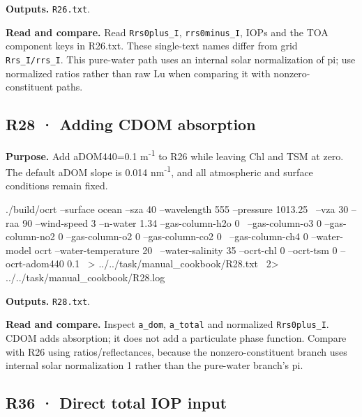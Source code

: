 \textbf{Outputs. }\texttt{R26.txt}.

\textbf{Read and compare. }Read \texttt{Rrs0plus\_\allowbreak{}I}, \texttt{rrs0minus\_\allowbreak{}I}, IOPs and the TOA component keys in R26.txt. These single-text names differ from grid \texttt{Rrs\_\allowbreak{}I/\allowbreak{}rrs\_\allowbreak{}I}. This pure-water path uses an internal solar normalization of pi; use normalized ratios rather than raw Lu when comparing it with nonzero-constituent paths.

\clearpage

\subsection{R28 · Adding CDOM absorption}
\label{sec:auto:09_cookbook:5.2}

\label{recipe:R28}

\textbf{Purpose. }Add aDOM440=0.1 m\textsuperscript{-1} to R26 while leaving Chl and TSM at zero. The default aDOM slope is 0.014 nm\textsuperscript{-1}, and all atmospheric and surface conditions remain fixed.

\noindent\begin{minipage}{\linewidth}
\begin{ManualCode}

./build/ocrt --surface ocean --sza 40 --wavelength 555 --pressure 1013.25 \
  --vza 30 --raa 90 --wind-speed 3 --n-water 1.34 --gas-column-h2o 0 \
  --gas-column-o3 0 --gas-column-no2 0 --gas-column-o2 0 --gas-column-co2 0 \
  --gas-column-ch4 0 --water-model ocrt --water-temperature 20 \
  --water-salinity 35 --ocrt-chl 0 --ocrt-tsm 0 --ocrt-adom440 0.1 \
  > ../../task/manual_cookbook/R28.txt \
  2> ../../task/manual_cookbook/R28.log

\end{ManualCode}
\end{minipage}\par

\textbf{Outputs. }\texttt{R28.txt}.

\textbf{Read and compare. }Inspect \texttt{a\_\allowbreak{}dom}, \texttt{a\_\allowbreak{}total} and normalized \texttt{Rrs0plus\_\allowbreak{}I}. CDOM adds absorption; it does not add a particulate phase function. Compare with R26 using ratios/reflectances, because the nonzero-constituent branch uses internal solar normalization 1 rather than the pure-water branch's pi.

\clearpage

\subsection{R36 · Direct total IOP input}
\label{sec:auto:09_cookbook:5.3}

